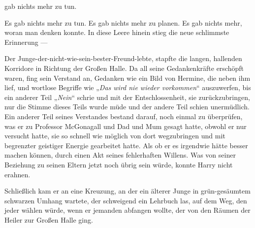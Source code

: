 
 gab nichts mehr zu tun.

\hplettrineextrapara


Es gab nichts mehr zu tun. Es gab nichts mehr zu planen. Es gab nichts mehr, woran man denken konnte. In diese Leere hinein stieg die neue schlimmste Erinnerung —

Der Junge-der-nicht-wie-sein-bester-Freund-lebte, stapfte die langen, hallenden Korridore in Richtung der Großen Halle. Da all seine Gedankenkräfte erschöpft waren, fing sein Verstand an, Gedanken wie ein Bild von Hermine, die neben ihm lief, und wortlose Begriffe wie
„\emph{Das wird nie wieder vorkommen}“ auszuwerfen, bis ein anderer Teil
„\emph{Nein}“ schrie und mit der Entschlossenheit, sie zurückzubringen, nur die Stimme dieses Teils wurde müde und der andere Teil schien unermüdlich. Ein anderer Teil seines Verstandes bestand darauf, noch einmal zu überprüfen, was er zu Professor McGonagall und Dad und Mum gesagt hatte, obwohl er nur versucht hatte, sie so schnell wie möglich von dort wegzubringen und mit begrenzter geistiger Energie gearbeitet hatte. Als ob er es irgendwie hätte besser machen können, durch einen Akt seines fehlerhaften Willens. Was von seiner Beziehung zu seinen Eltern jetzt noch übrig sein würde, konnte Harry nicht erahnen.

Schließlich kam er an eine Kreuzung, an der ein älterer Junge in grün-gesäumtem schwarzen Umhang wartete, der schweigend ein Lehrbuch las, auf dem Weg, den jeder wählen würde, wenn er jemanden abfangen wollte, der von den Räumen der Heiler zur Großen Halle ging.

